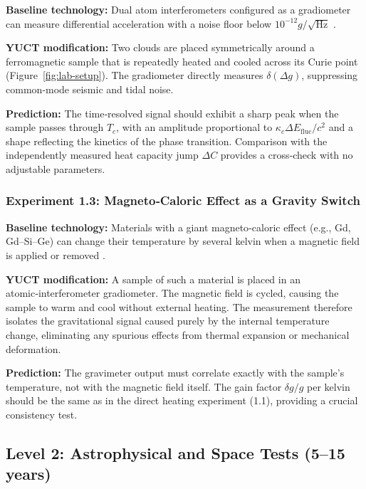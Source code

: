 \documentclass[12pt]{article}
\theoremstyle{remark}
\begin{document}
	\textbf{Baseline technology:} Dual atom interferometers configured as a gradiometer can measure differential
	acceleration with a noise floor below \(10^{-12}g/\sqrt{\mathrm{Hz}}\) \cite{Snadden1998}.
	
	\textbf{YUCT modification:} Two clouds are placed symmetrically around a ferromagnetic sample that is repeatedly
	heated and cooled across its Curie point (Figure~\ref{fig:lab-setup}).  
	The gradiometer directly measures \(\delta(\Delta g)\), suppressing common‑mode seismic and tidal noise.
	
	\textbf{Prediction:} The time‑resolved signal should exhibit a sharp peak when the sample passes through \(T_c\),
	with an amplitude proportional to \(\kappa_c \Delta E_{\mathrm{fluc}}/c^2\) and a shape reflecting the kinetics of the
	phase transition.  
	Comparison with the independently measured heat capacity jump \(\Delta C\) provides a cross‑check with no adjustable
	parameters.
	
	\subsubsection{Experiment 1.3: Magneto‑Caloric Effect as a Gravity Switch}
	
	\textbf{Baseline technology:} Materials with a giant magneto‑caloric effect (e.g., Gd, Gd–Si–Ge) can change their
	temperature by several kelvin when a magnetic field is applied or removed \cite{Gschneidner1999}.
	
	\textbf{YUCT modification:} A sample of such a material is placed in an atomic‑interferometer gradiometer.  
	The magnetic field is cycled, causing the sample to warm and cool without external heating.  
	The measurement therefore isolates the gravitational signal caused purely by the internal temperature change,
	eliminating any spurious effects from thermal expansion or mechanical deformation.
	
	\textbf{Prediction:} The gravimeter output must correlate exactly with the sample’s temperature, not with the
	magnetic field itself.  
	The gain factor \(\delta g/g\) per kelvin should be the same as in the direct heating experiment (1.1),
	providing a crucial consistency test.
	
	\subsection{Level 2: Astrophysical and Space Tests (5–15 years)}
	\label{subsec:space-tests}
	
\end{document}
